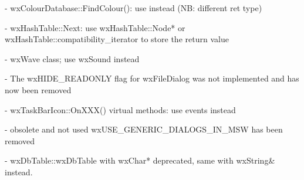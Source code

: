- wxColourDatabase::FindColour(): use  instead (NB: different ret type)

- wxHashTable::Next: use wxHashTable::Node* or
                     wxHashTable::compatibility\_iterator to store the return
                     value

- wxWave class; use wxSound instead

- The wxHIDE\_READONLY flag for wxFileDialog was not implemented
  and has now been removed

- wxTaskBarIcon::OnXXX() virtual methods: use events instead

- obsolete and not used wxUSE\_GENERIC\_DIALOGS\_IN\_MSW has been removed

- wxDbTable::wxDbTable with wxChar* deprecated, same with wxString& instead.

